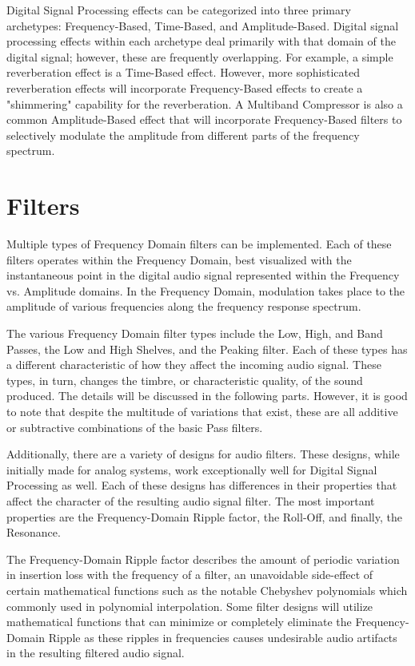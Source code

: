 \documentclass[a4paper,12pt]{report}
\begin{document}
Digital Signal Processing effects can be categorized into three primary archetypes: Frequency-Based, Time-Based, and Amplitude-Based. Digital signal processing effects within each archetype deal primarily with that domain of the digital signal; however, these are frequently overlapping. For example, a simple reverberation effect is a Time-Based effect. However, more sophisticated reverberation effects will incorporate Frequency-Based effects to create a "shimmering" capability for the reverberation. A Multiband Compressor is also a common Amplitude-Based effect that will incorporate Frequency-Based filters to selectively modulate the amplitude from different parts of the frequency spectrum.

\section{Filters}
\label{sec:filters}
Multiple types of Frequency Domain filters can be implemented. Each of these filters operates within the Frequency Domain, best visualized with the instantaneous point in the digital audio signal represented within the Frequency vs. Amplitude domains. In the Frequency Domain, modulation takes place to the amplitude of various frequencies along the frequency response spectrum. 

The various Frequency Domain filter types include the Low, High, and Band Passes, the Low and High Shelves, and the Peaking filter. Each of these types has a different characteristic of how they affect the incoming audio signal. These types, in turn, changes the timbre, or characteristic quality, of the sound produced. The details will be discussed in the following parts. However, it is good to note that despite the multitude of variations that exist, these are all additive or subtractive combinations of the basic Pass filters.

Additionally, there are a variety of designs for audio filters. These designs, while initially made for analog systems, work exceptionally well for Digital Signal Processing as well. Each of these designs has differences in their properties that affect the character of the resulting audio signal filter. The most important properties are the Frequency-Domain Ripple factor, the Roll-Off, and finally, the Resonance.

The Frequency-Domain Ripple factor describes the amount of periodic variation in insertion loss with the frequency of a filter, an unavoidable side-effect of certain mathematical functions such as the notable Chebyshev polynomials which commonly used in polynomial interpolation. Some filter designs will utilize mathematical functions that can minimize or completely eliminate the Frequency-Domain Ripple as these ripples in frequencies causes undesirable audio artifacts in the resulting filtered audio signal.
\end{document}
